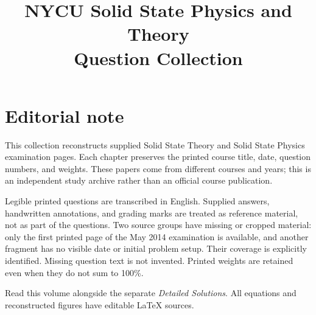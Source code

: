 \documentclass[11pt,a4paper,oneside]{book}
\title{NYCU Solid State Physics and Theory\\[1em]\Large Question Collection}
\author{}
\date{}
\begin{document}
\frontmatter
\maketitle
\chapter*{Editorial note}
This collection reconstructs supplied Solid State Theory and Solid State Physics examination pages. Each chapter preserves the printed course title, date, question numbers, and weights. These papers come from different courses and years; this is an independent study archive rather than an official course publication.

Legible printed questions are transcribed in English. Supplied answers, handwritten annotations, and grading marks are treated as reference material, not as part of the questions. Two source groups have missing or cropped material: only the first printed page of the May 2014 examination is available, and another fragment has no visible date or initial problem setup. Their coverage is explicitly identified. Missing question text is not invented. Printed weights are retained even when they do not sum to 100\%.

Read this volume alongside the separate \textit{Detailed Solutions}. All equations and reconstructed figures have editable \LaTeX{} sources.
\tableofcontents
\mainmatter











\end{document}
